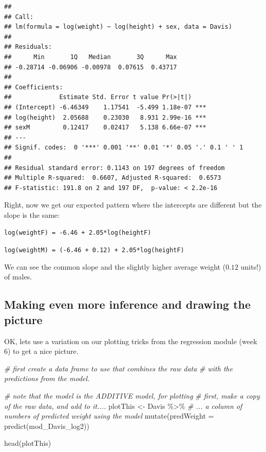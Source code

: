 \documentclass[
]{book}
\newenvironment{Shaded}{\begin{snugshade}}{\end{snugshade}}
\newcommand{\AttributeTok}[1]{\textcolor[rgb]{0.77,0.63,0.00}{#1}}
\newcommand{\CommentTok}[1]{\textcolor[rgb]{0.56,0.35,0.01}{\textit{#1}}}
\newcommand{\FunctionTok}[1]{\textcolor[rgb]{0.00,0.00,0.00}{#1}}
\newcommand{\NormalTok}[1]{#1}
\newcommand{\OtherTok}[1]{\textcolor[rgb]{0.56,0.35,0.01}{#1}}
\newcommand{\SpecialCharTok}[1]{\textcolor[rgb]{0.00,0.00,0.00}{#1}}
\begin{document}
\begin{verbatim}
## 
## Call:
## lm(formula = log(weight) ~ log(height) + sex, data = Davis)
## 
## Residuals:
##      Min       1Q   Median       3Q      Max 
## -0.28714 -0.06906 -0.00978  0.07615  0.43717 
## 
## Coefficients:
##             Estimate Std. Error t value Pr(>|t|)    
## (Intercept) -6.46349    1.17541  -5.499 1.18e-07 ***
## log(height)  2.05688    0.23030   8.931 2.99e-16 ***
## sexM         0.12417    0.02417   5.138 6.66e-07 ***
## ---
## Signif. codes:  0 '***' 0.001 '**' 0.01 '*' 0.05 '.' 0.1 ' ' 1
## 
## Residual standard error: 0.1143 on 197 degrees of freedom
## Multiple R-squared:  0.6607, Adjusted R-squared:  0.6573 
## F-statistic: 191.8 on 2 and 197 DF,  p-value: < 2.2e-16
\end{verbatim}

Right, now we get our expected pattern where the intercepts are different but the slope is the same:

\texttt{log(weightF)\ =\ -6.46\ +\ 2.05*log(heightF)}

\texttt{log(weightM)\ =\ (-6.46\ +\ 0.12)\ +\ 2.05*log(heightF)}

We can see the common slope and the slightly higher average weight (\(0.12\) units!) of males.

\hypertarget{making-even-more-inference-and-drawing-the-picture}{%
\subsection{Making even more inference and drawing the picture}\label{making-even-more-inference-and-drawing-the-picture}}

OK, lets use a variation on our plotting tricks from the regression module (week 6) to get a nice picture.

\begin{Shaded}
\begin{Highlighting}[]
\CommentTok{\# first create a data frame to use that combines the raw data}
\CommentTok{\# with the predictions from the model.}

\CommentTok{\# note that the model is the ADDITIVE model, for plotting}
\CommentTok{\# first, make a copy of the raw data, and add to it....}
\NormalTok{plotThis }\OtherTok{\textless{}{-}}\NormalTok{ Davis }\SpecialCharTok{\%\textgreater{}\%}
  \CommentTok{\# ... a column of numbers of predicted weight using the model}
  \FunctionTok{mutate}\NormalTok{(}\AttributeTok{predWeight =} \FunctionTok{predict}\NormalTok{(mod\_Davis\_log2))}

\FunctionTok{head}\NormalTok{(plotThis)}
\end{Highlighting}
\end{Shaded}
\end{document}
